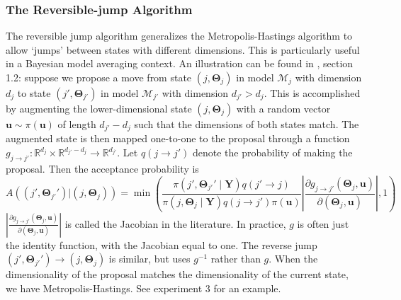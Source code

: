 \documentclass[a4paper,11pt]{article}
\begin{document}
\subsubsection{The Reversible-jump Algorithm}
The reversible jump algorithm \cite{green_reversible_1995} generalizes the Metropolis-Hastings algorithm to allow `jumps' between states with different dimensions. This is particularly useful in a Bayesian model averaging context. An illustration can be found in \cite{brooks_handbook_2011}, section 1.2: suppose we propose a move from state $(j, \mathbf{\Theta}_{j})$ in model $\mathcal{M}_{j}$ with dimension $d_{j}$ to state $(j', \mathbf{\Theta}_{j'})$ in model $\mathcal{M}_{j'}$ with dimension $d_{j'}>d_{j}$. This is accomplished by augmenting the lower-dimensional state $(j, \mathbf{\Theta}_{j})$ with a random vector $\mathbf{u} \sim \pi(\mathbf{u})$ of length $d_{j'}-d_{j}$ such that the dimensions of both states match. The augmented state is then mapped one-to-one to the proposal through a function $g_{j \rightarrow j'}: \mathbb{R}^{d_{j}} \times \mathbb{R}^{d_{j'}-d_{j}} \rightarrow \mathbb{R}^{d_{j'}}$. Let $q(j \rightarrow j')$ denote the probability of making the proposal. Then the acceptance probability is
$$
A((j', \mathbf{\Theta}_{j'}')|(j, \mathbf{\Theta}_{j}))=\min \left( \frac{\pi(j', \mathbf{\Theta}_{j'}' \mid \mathbf{Y}) q(j' \rightarrow j)}{\pi(j, \mathbf{\Theta}_{j} \mid \mathbf{Y}) q(j \rightarrow j') \pi(\mathbf{u})}\left|\frac{\partial g_{j \rightarrow j'}(\mathbf{\Theta}_{j}, \mathbf{u})}{\partial(\mathbf{\Theta}_{j}, \mathbf{u})}\right|, 1\right)
$$
$\left|\frac{\partial g_{j \rightarrow j'}(\mathbf{\Theta}_{j}, \mathbf{u})}{\partial(\mathbf{\Theta}_{j}, \mathbf{u})}\right|$ is called the Jacobian in the literature. In practice, $g$ is often just the identity function, with the Jacobian equal to one. The reverse jump $(j', \mathbf{\Theta}_{j'}') \rightarrow (j, \mathbf{\Theta}_{j})$ is similar, but uses $g^{-1}$ rather than $g$. When the dimensionality of the proposal matches the dimensionality of the current state, we have Metropolis-Hastings. See experiment 3 for an example.
\end{document}
